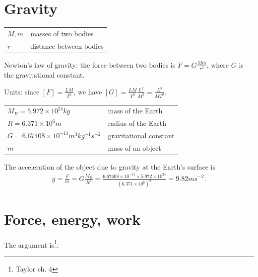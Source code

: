 \renewcommand{\r}{\vec{r}}

\section{Gravity}

\begin{tabular*}{1.0\linewidth}{l|l}
  $M, m$ & masses of two bodies \\
  $r$    & distance between bodies
\end{tabular*}

Newton's law of gravity: the force between two bodies is $F = G\frac{Mm}{r^2}$, where $G$ is the
gravitational constant.

Units: since $[F] = \frac{LM}{T^2}$, we have $[G] = \frac{LM}{T^2}\frac{L^2}{M^2} = \frac{L^3}{MT^2}$.

\begin{tabular*}{1.0\linewidth}{l|l}
  $M_E = 5.972 \times 10^{24} kg$ & mass of the Earth \\
  $R =  6.371 \times 10^6 m$     & radius of the Earth \\
  $G = 6.67408 \times 10^{-11} m^3 kg^{-1} s^{-2}$        & gravitational constant\\
  $m$ & mass of an object
\end{tabular*}

The acceleration of the object due to gravity at the Earth's surface is
\begin{align*}
  g
  = \frac{F}{m}
  = G\frac{M_E}{R^2}
  = \frac{6.67408 \times 10^{-11} \times 5.972 \times 10^{24}}{(6.371 \times 10^6)^2}
  = 9.82 ms^{-2}.
\end{align*}



\section{Force, energy, work}
The argument is\footnote{Taylor ch. 4}:

